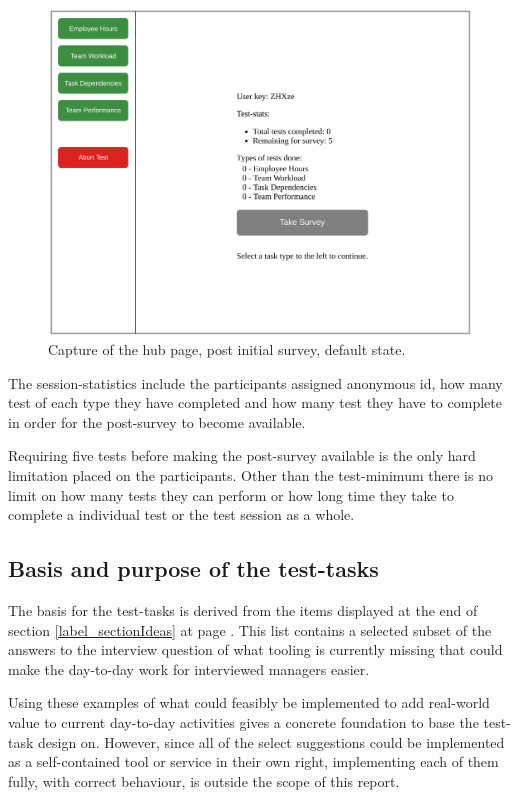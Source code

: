 \documentclass[nofilelist,dvipsnames]{cslthse-msc}
\begin{document}
{        \begin{figure}[h!]
          \centering
          \includegraphics[width=.7\textwidth]{figures/captures/webapp_main_statistics.pdf}
          \caption{Capture of the hub page, post initial survey, default state.}
          \label{label_mainStatistics}
        \end{figure}

        The session-statistics include the participants assigned anonymous id,
        how many test of each type they have completed and how many test they
        have to complete in order for the post-survey to become available.

        Requiring five tests before making the post-survey available is the only
        hard limitation placed on the participants. Other than the test-minimum
        there is no limit on how many tests they can perform or how long time
        they take to complete a individual test or the test session as a whole.

      \subsection{Basis and purpose of the test-tasks}

        The basis for the test-tasks is derived from the items displayed at the
        end of section \ref{label_sectionIdeas} at page \pageref{label_ideas}.
        This list contains a selected subset of the answers to the
        interview question of what tooling is currently missing that could make
        the day-to-day work for interviewed managers easier.

        Using these examples of what could feasibly be implemented to add
        real-world value to current day-to-day activities gives a concrete
        foundation to base the test-task design on. However, since all of
        the select suggestions could be implemented as a self-contained tool or
        service in their own right, implementing each of them fully, with
        correct behaviour, is outside the scope of this report.

}
\end{document}
